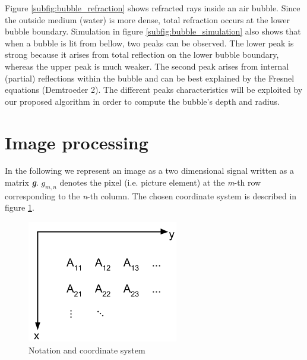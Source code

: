 			Figure \ref{subfig:bubble_refraction} shows refracted rays inside an air bubble. Since the outside medium (water) is more dense, total refraction occurs at the lower bubble boundary. Simulation in figure \ref{subfig:bubble_simulation} also shows that when a bubble is lit from bellow, two peaks can be observed. The lower peak is strong because it arises from total reflection on the lower bubble boundary, whereas the upper peak is much weaker. The second peak arises from internal (partial) reflections within the bubble and can be best explained by the Fresnel equations (Demtroeder 2). 
			The different peaks characteristics will be exploited by our proposed algorithm in order to compute the bubble's depth and radius.
			
			
	
	\section{Image processing}	\label{image_processing}
	In the following we represent an image as a two dimensional signal written as a matrix \textit{\textbf{g}}. $g_{m,n}$ denotes the pixel (i.e. picture element) at the \textit{m}-th row corresponding to the \textit{n}-th column. The chosen coordinate system is described in figure \ref{fig:coord_sys}. 
	
		\begin{figure}
		    \centering
		    \includegraphics[scale=0.4]{images/coord_sys.png}
		    \caption{Notation and coordinate system}
		    \label{fig:coord_sys}
		\end{figure}
	
